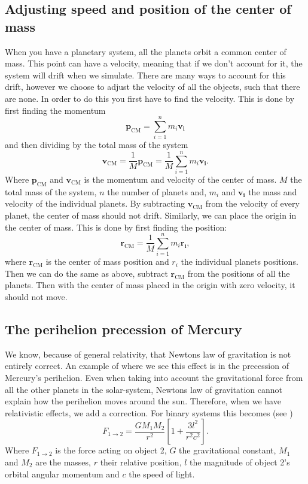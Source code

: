 \documentclass[reprint, english,notitlepage,nofootinbib]{revtex4-1}  %
\begin{document}
\subsection{Adjusting speed and position of the center of mass}
When you have a planetary system, all the planets orbit a common center of mass. This point can have a velocity, meaning that if we don't account for it, the system will drift when we simulate. There are many ways to account for this drift, however we choose to adjust the velocity of all the objects, such that there are none. In order to do this you first have to find the velocity. This is done by first finding the momentum
\begin{equation*}
	\mathbf{p}_{\text{CM}} = \sum_{i=1}^{n}m_i\mathbf{v_i}
\end{equation*} 
and then dividing by the total mass of the system
\begin{equation}
	\label{eq:v_cm}
	\mathbf{v}_{\text{CM}} = \frac{1}{M}\mathbf{p}_{\text{CM}} =  \frac{1}{M}\sum_{i=1}^{n}m_i\mathbf{v_i}.
\end{equation} 
Where $\mathbf{p}_{\text{CM}}$ and $\mathbf{v}_{\text{CM}}$ is the momentum and velocity of the center of mass. $M$ the total mass of the system, $n$ the number of planets and, $m_i$ and $\mathbf{v_i}$ the mass and velocity of the individual planets. By subtracting $\mathbf{v}_{\text{CM}}$ from the velocity of every planet, the center of mass should not drift. Similarly, we can place the origin in the center of mass. This is done by first finding the position:
\begin{equation}
	\label{eq:r_cm}
	\mathbf{r}_{\text{CM}} =  \frac{1}{M}\sum_{i=1}^{n}m_i\mathbf{r_i},
\end{equation}
where $\mathbf{r}_{\text{CM}}$ is the center of mass position and $r_i$ the individual planets positions. Then we can do the same as above, subtract $\mathbf{r}_{\text{CM}}$ from the positions of all the planets. Then with the center of mass placed in the origin with zero velocity, it should not move.

\subsection{The perihelion precession of Mercury}
We know, because of general relativity, that Newtons law of gravitation is not entirely correct. An example of where we see this effect is in the precession of Mercury's perihelion. Even when taking into account the gravitational force from all the other planets in the solar-system, Newtons law of gravitation cannot explain how the perihelion moves around the sun. Therefore, when we have relativistic effects, we add a correction. For binary systems this becomes (see \citep{oppgavetekst})
\begin{equation}
	\label{eq:general_relativity}
	F_{1 \rightarrow 2} = \frac{GM_1M_2}{r^2}\left[ 1 + \frac{3l^2}{r^2c^2} \right].
\end{equation}
Where $F_{1 \rightarrow 2}$ is the force acting on object 2, $G$ the gravitational constant, $M_1$ and $M_2$ are the masses, $r$ their relative position, $l$ the magnitude of object 2's orbital angular momentum and $c$ the speed of light.
\end{document}
